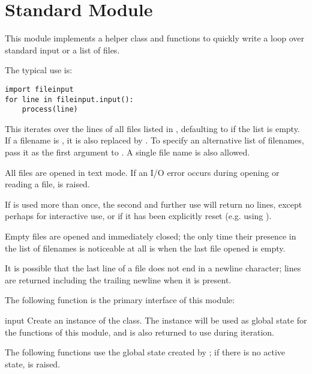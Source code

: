 
\section{Standard Module }
\label{module-fileinput}

This module implements a helper class and functions to quickly write a
loop over standard input or a list of files.

The typical use is:

\begin{verbatim}
import fileinput
for line in fileinput.input():
    process(line)
\end{verbatim}

This iterates over the lines of all files listed in
, defaulting to  if the list is
empty.  If a filename is , it is also replaced by
.  To specify an alternative list of filenames, pass
it as the first argument to .  A single file name is
also allowed.

All files are opened in text mode.  If an I/O error occurs during
opening or reading a file,  is raised.

If  is used more than once, the second and further use
will return no lines, except perhaps for interactive use, or if it has
been explicitly reset (e.g. using ).

Empty files are opened and immediately closed; the only time their
presence in the list of filenames is noticeable at all is when the
last file opened is empty.

It is possible that the last line of a file does not end in a newline
character; lines are returned including the trailing newline when it
is present.

The following function is the primary interface of this module:

\begin{funcdesc}{input}{}
  Create an instance of the  class.  The instance
  will be used as global state for the functions of this module, and
  is also returned to use during iteration.
\end{funcdesc}


The following functions use the global state created by
; if there is no active state,
 is raised.

